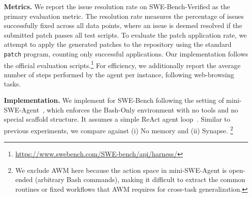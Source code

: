\noindent\textbf{Metrics.} We report the issue resolution rate on SWE-Bench-Verified as the primary evaluation metric. The resolution rate measures the percentage of issues successfully fixed across all data points, where an issue is deemed resolved if the submitted patch passes all test scripts. To evaluate the patch application rate, we attempt to apply the generated patches to the repository using the standard \texttt{patch} program, counting only successful applications. Our implementation follows the official evaluation scripts.\footnote{\url{https://www.swebench.com/SWE-bench/api/harness/}}
 For efficiency, we additionally report the average number of steps performed by the agent per instance, following web-browsing tasks.

\noindent\textbf{Implementation.} We implement \ours{} for SWE-Bench following the setting of mini-SWE-Agent~\citep{yang2024sweagent}, which enforces the Bash-Only environment with no tools and no special scaffold structure. It assumes a simple ReAct agent loop~\citep{yao2023react}. Similar to previous experiments, we compare \ours{} against (i) No memory and (ii) Synapse.
\footnote{We exclude AWM here because the action space in mini-SWE-Agent is open-ended (arbitrary Bash commands), making it difficult to extract the common routines or fixed workflows that AWM requires for cross-task generalization.}






